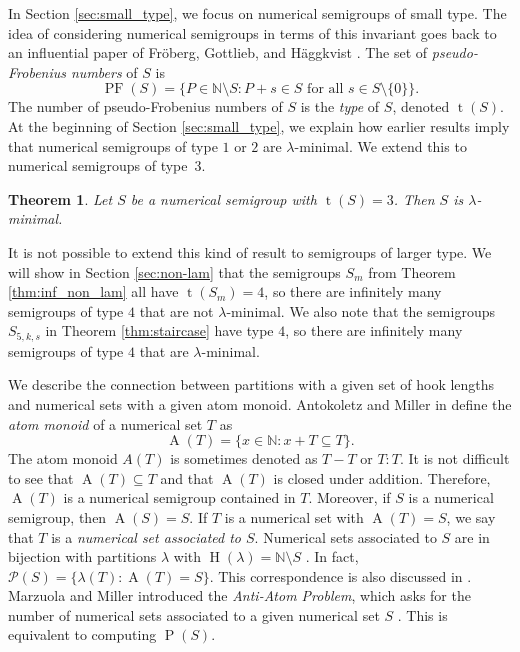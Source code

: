 \documentclass{amsproc}
\newcommand{\N}{\mathbb{N}}
\DeclareMathOperator{\Hook}{H}
\DeclareMathOperator{\PF}{PF}
\DeclareMathOperator{\Pa}{P}
\DeclareMathOperator{\type}{t}
\DeclareMathOperator{\A}{A}
\newtheorem{theorem}{Theorem}[section]
\theoremstyle{definition}
\theoremstyle{remark}
\numberwithin{equation}{section}
\begin{document}
In Section \ref{sec:small_type}, we focus on numerical semigroups of small type.  The idea of considering numerical semigroups in terms of this invariant goes back to an influential paper of Fr\"oberg, Gottlieb, and H\"aggkvist \cite{Fröberg198663}.  The set of \emph{pseudo-Frobenius numbers} of $S$ is
\[
\PF(S) = \{P \in \N \setminus S \colon P + s \in S \text{ for all } s \in S \setminus \{0\}\}.
\]
The number of pseudo-Frobenius numbers of $S$ is the \emph{type} of $S$, denoted $\type(S)$.  At the beginning of Section \ref{sec:small_type}, we explain how earlier results imply that numerical semigroups of type $1$ or $2$ are $\lambda$-minimal. 
We extend this to numerical semigroups of type~$3$.
\begin{theorem}
\label{thm:type3minimality}
Let $S$ be a numerical semigroup with $\type(S) = 3$.  Then $S$ is $\lambda$-minimal.
\end{theorem}

It is not possible to extend this kind of result to semigroups of larger type.  We will show in Section \ref{sec:non-lam} that the semigroups $S_m$ from Theorem \ref{thm:inf_non_lam} all have $\type(S_m) = 4$, so there are infinitely many  semigroups of type $4$ that are not $\lambda$-minimal. We also note that the semigroups $S_{5,k,s}$ in Theorem \ref{thm:staircase} have type $4$, so there are infinitely many semigroups of type $4$ that are $\lambda$-minimal.

We describe the connection between partitions with a given set of hook lengths and numerical sets with a given atom monoid. Antokoletz and Miller in \cite{ANTOKOLETZ2002636} define the \emph{atom monoid} of a numerical set $T$ as 
\[
\A(T) = \{x \in \N \colon x + T \subseteq T\}.
\]
The atom monoid $A(T)$ is sometimes denoted as $T-T$ or $T:T$. 
It is not difficult to see that $\A(T) \subseteq T$ and that $\A(T)$ is closed under addition.  Therefore, $\A(T)$ is a numerical semigroup contained in $T$.  Moreover, if $S$ is a numerical semigroup, then $\A(S) = S$.  If $T$ is a numerical set with $\A(T) = S$, we say that $T$ is a \emph{numerical set associated to $S$}.  Numerical sets associated to $S$ are in bijection with partitions $\lambda$ with $\Hook(\lambda) = \N \setminus S$ \cite[Corollary 1]{KeithNath}.
In fact, $\mathcal{P}(S)=\{\lambda(T): \A(T)=S\}$.
This correspondence is also discussed in \cite[Section 2]{CONSTANTIN201799}.  Marzuola and Miller introduced the \emph{Anti-Atom Problem}, which asks for the number of numerical sets associated to a given numerical set $S$ \cite{MarzuolaMiller}.  This is equivalent to computing $\Pa(S)$.
\end{document}
